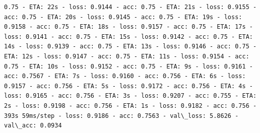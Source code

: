 \documentclass[11pt]{article}
\begin{document}
\begin{Verbatim}[commandchars=\\\{\}]
0.75 - ETA: 22s - loss: 0.9144 - acc: 0.75 - ETA: 21s - loss: 0.9155 - acc: 0.75 - ETA: 20s - loss: 0.9145 - acc: 0.75 - ETA: 19s - loss: 0.9158 - acc: 0.75 - ETA: 18s - loss: 0.9157 - acc: 0.75 - ETA: 17s - loss: 0.9141 - acc: 0.75 - ETA: 15s - loss: 0.9142 - acc: 0.75 - ETA: 14s - loss: 0.9139 - acc: 0.75 - ETA: 13s - loss: 0.9146 - acc: 0.75 - ETA: 12s - loss: 0.9147 - acc: 0.75 - ETA: 11s - loss: 0.9154 - acc: 0.75 - ETA: 10s - loss: 0.9152 - acc: 0.75 - ETA: 9s - loss: 0.9161 - acc: 0.7567 - ETA: 7s - loss: 0.9160 - acc: 0.756 - ETA: 6s - loss: 0.9157 - acc: 0.756 - ETA: 5s - loss: 0.9172 - acc: 0.756 - ETA: 4s - loss: 0.9165 - acc: 0.756 - ETA: 3s - loss: 0.9207 - acc: 0.755 - ETA: 2s - loss: 0.9198 - acc: 0.756 - ETA: 1s - loss: 0.9182 - acc: 0.756 - 393s 59ms/step - loss: 0.9186 - acc: 0.7563 - val\_loss: 5.8626 - val\_acc: 0.0934


\end{Verbatim}
\end{document}
